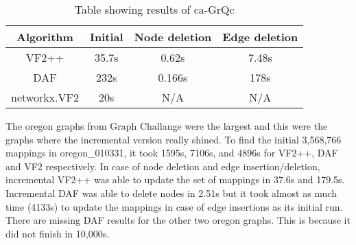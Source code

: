 \begin{table}[h!]
	\centering
	\def\arraystretch{1.2}
	\begin{tabular}{c|c|c|c}
	\hline
	Algorithm     & Initial  & Node deletion & Edge deletion    \\ \hline \hline
	VF2++         & 35.7s  & 0.62s     & 7.48s \\ \hline
	DAF           & 232s  & 0.166s   & 178s \\ \hline
	networkx.VF2  & 20s  & N/A     & N/A \\ \hline
	\end{tabular}

	\caption{Table showing results of ca-GrQc}
\end{table}

The oregon graphs from Graph Challange were the largest and this were the graphs where the incremental version really shined.
To find the initial 3,568,766 mappings in oregon\_010331, it took 1595s, 7106s, and 4896s for VF2++, DAF and VF2 respectively. 
In case of node deletion and edge insertion/deletion, incremental VF2++ was able to update the set of mappings in 37.6s and 179.5s.
Incremental DAF was able to delete nodes in 2.51s but it took almost as much time (4133s) to update the mappings in case of edge
insertions as its initial run. There are missing DAF results for the other two oregon graphs. This is because it did not finish in 10,000s.

